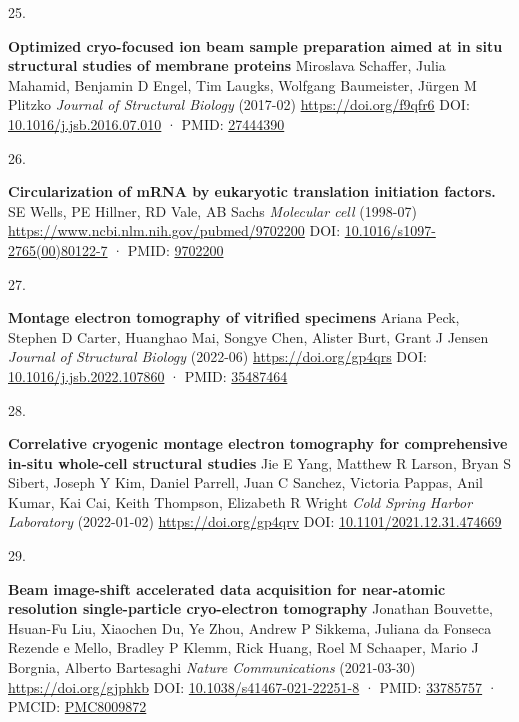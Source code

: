 \documentclass[
]{article}
\newlength{\cslhangindent}
\newlength{\csllabelwidth}
\newlength{\cslentryspacingunit} %
\newenvironment{CSLReferences}[2] %
 {%
  \setlength{\parindent}{0pt}
  \ifodd #1
  \let\oldpar\par
  \def\par{\hangindent=\cslhangindent\oldpar}
  \fi
  \setlength{\parskip}{#2\cslentryspacingunit}
 }%
 {}
\newcommand{\CSLBlock}[1]{#1\hfill\break}
\newcommand{\CSLLeftMargin}[1]{\parbox[t]{\csllabelwidth}{#1}}
\newcommand{\CSLRightInline}[1]{\parbox[t]{\linewidth - \csllabelwidth}{#1}\break}
\begin{document}
\begin{CSLReferences}{0}{0}
\leavevmode{}%
\CSLLeftMargin{25. }%
\CSLRightInline{\textbf{Optimized cryo-focused ion beam sample preparation aimed at in situ structural studies of membrane proteins}
\CSLBlock{Miroslava Schaffer, Julia Mahamid, Benjamin D Engel, Tim Laugks, Wolfgang Baumeister, Jürgen M Plitzko} \emph{Journal of Structural Biology} (2017-02) \url{https://doi.org/f9qfr6}
\CSLBlock{DOI: \href{https://doi.org/10.1016/j.jsb.2016.07.010}{10.1016/j.jsb.2016.07.010} · PMID: \href{https://www.ncbi.nlm.nih.gov/pubmed/27444390}{27444390}}}

\leavevmode{}%
\CSLLeftMargin{26. }%
\CSLRightInline{\textbf{Circularization of mRNA by eukaryotic translation initiation factors.}
\CSLBlock{SE Wells, PE Hillner, RD Vale, AB Sachs} \emph{Molecular cell} (1998-07) \url{https://www.ncbi.nlm.nih.gov/pubmed/9702200}
\CSLBlock{DOI: \href{https://doi.org/10.1016/s1097-2765(00)80122-7}{10.1016/s1097-2765(00)80122-7} · PMID: \href{https://www.ncbi.nlm.nih.gov/pubmed/9702200}{9702200}}}

\leavevmode{}%
\CSLLeftMargin{27. }%
\CSLRightInline{\textbf{Montage electron tomography of vitrified specimens}
\CSLBlock{Ariana Peck, Stephen D Carter, Huanghao Mai, Songye Chen, Alister Burt, Grant J Jensen} \emph{Journal of Structural Biology} (2022-06) \url{https://doi.org/gp4qrs}
\CSLBlock{DOI: \href{https://doi.org/10.1016/j.jsb.2022.107860}{10.1016/j.jsb.2022.107860} · PMID: \href{https://www.ncbi.nlm.nih.gov/pubmed/35487464}{35487464}}}

\leavevmode{}%
\CSLLeftMargin{28. }%
\CSLRightInline{\textbf{Correlative cryogenic montage electron tomography for comprehensive in-situ whole-cell structural studies}
\CSLBlock{Jie E Yang, Matthew R Larson, Bryan S Sibert, Joseph Y Kim, Daniel Parrell, Juan C Sanchez, Victoria Pappas, Anil Kumar, Kai Cai, Keith Thompson, Elizabeth R Wright} \emph{Cold Spring Harbor Laboratory} (2022-01-02) \url{https://doi.org/gp4qrv}
\CSLBlock{DOI: \href{https://doi.org/10.1101/2021.12.31.474669}{10.1101/2021.12.31.474669}}}

\leavevmode{}%
\CSLLeftMargin{29. }%
\CSLRightInline{\textbf{Beam image-shift accelerated data acquisition for near-atomic resolution single-particle cryo-electron tomography}
\CSLBlock{Jonathan Bouvette, Hsuan-Fu Liu, Xiaochen Du, Ye Zhou, Andrew P Sikkema, Juliana da Fonseca Rezende e Mello, Bradley P Klemm, Rick Huang, Roel M Schaaper, Mario J Borgnia, Alberto Bartesaghi} \emph{Nature Communications} (2021-03-30) \url{https://doi.org/gjphkb}
\CSLBlock{DOI: \href{https://doi.org/10.1038/s41467-021-22251-8}{10.1038/s41467-021-22251-8} · PMID: \href{https://www.ncbi.nlm.nih.gov/pubmed/33785757}{33785757} · PMCID: \href{https://www.ncbi.nlm.nih.gov/pmc/articles/PMC8009872}{PMC8009872}}}


\end{CSLReferences}
\end{document}
